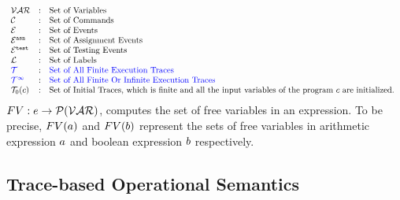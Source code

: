\[
\begin{array}{lll}
\mathcal{VAR} & : & \mbox{Set of Variables}  
\\ 
%
\cdom & : & \mbox{Set of Commands} 
\\ 
%
\eventset  & : & \mbox{Set of Events}  
\\
%
\eventset^{\asn}  & : & \mbox{Set of Assignment Events}  
\\
%
\eventset^{\test}  & : & \mbox{Set of Testing Events}  
\\
%
\ldom  & : & \mbox{Set of Labels}  
\\
%
\highlight{\tdom} & : & \mbox{\highlight{Set of All Finite Execution Traces}}
\\
\highlight{\tdom^{\infty}} & : & \mbox{\highlight{Set of All Finite Or Infinite  Execution Traces}}
\\
%
\tdom_0(c) & : & \mbox{Set of Initial Traces, which is finite and all the input variables of the program $c$ are initialized.
}
\end{array}
\]
$FV: e \to \mathcal{P}(\mathcal{VAR})$, computes the set of free variables in an expression. To be precise,
$FV(a)$ and $FV(b)$
represent the sets of free variables in arithmetic
expression $a$ and boolean expression $b$
respectively.
%
\subsection{{Trace-based Operational Semantics}}
\label{sec:operational_semantics}
